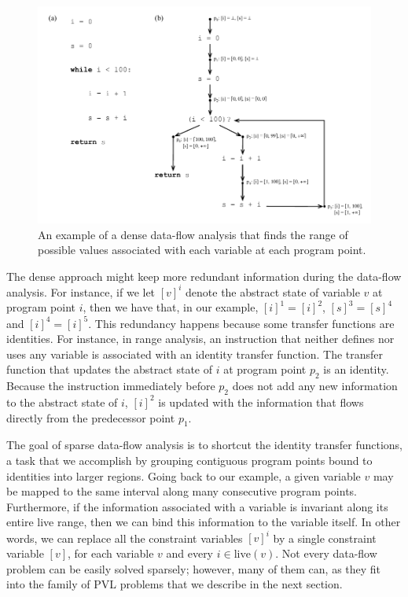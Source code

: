 \begin{figure}[t!]
\centering
\includegraphics[width=\linewidth]{ProgramPoint}
\caption{An example of a dense data-flow analysis that finds the range of
possible values associated with each variable at each program point.}
\label{fig:rangeAnalysis}
\end{figure}

The dense approach might keep more redundant information during the
data-flow analysis.
For instance, if we let $[v]^i$ denote the abstract state of variable
$v$ at program point $i$, then we have that, in our example, $[i]^1 = [i]^2$,
$[s]^3 = [s]^4$ and $[i]^4 = [i]^5$.
This redundancy happens because some transfer functions are identities.
For instance, in range analysis, an instruction that neither defines nor uses any variable is associated with an identity transfer function.
The transfer function that updates the abstract state of $i$ at program point $p_2$ is an identity.
Because the instruction immediately before $p_2$ does not add any new information to the abstract state of $i$, $[i]^2$ is updated with the information that flows directly from the predecessor point $p_1$.

The goal of sparse data-flow analysis is to shortcut the identity transfer functions, a task that we accomplish by grouping contiguous program points bound to identities into larger regions.
Going back to our example, a given variable $v$ may be mapped to the same interval along many consecutive program points.
Furthermore, if the information associated with a variable is invariant along its
entire live range, then we can bind this information to the variable itself.
In other words, we can replace all the constraint variables
$[v]^i$ by a single constraint variable $[v]$, for each variable $v$
and every $i\in \textrm{live}(v)$.
Not every data-flow problem can be easily solved sparsely; however, many of them can, as they fit into the family of PVL problems that we describe in the next section.

